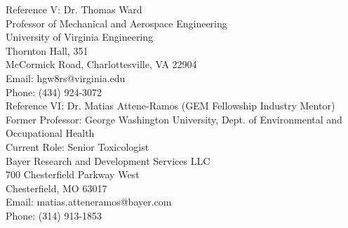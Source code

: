\documentclass[11pt,a4paper,sans]{moderncv}        %
\begin{document}
{Reference V: Dr. Thomas Ward\\
Professor of Mechanical and Aerospace Engineering\\
University of Virginia Engineering\\
Thornton Hall, 351\\
McCormick Road, Charlottesville, VA 22904\\
Email: hgw8rs@virginia.edu\\
Phone: (434) 924-3072\\

Reference VI: Dr. Matias Attene-Ramos (GEM Fellowship Industry Mentor)\\
Former Professor: George Washington University, Dept. of Environmental and Occupational Health\\
Current Role: Senior Toxicologist\\
Bayer Research and Development Services LLC\\
700 Chesterfield Parkway West\\
Chesterfield, MO 63017\\
Email: matias.atteneramos@bayer.com\\
Phone: (314) 913-1853\\

}
\end{document}
